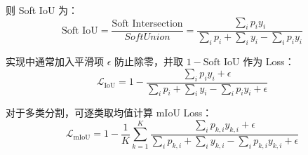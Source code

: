 则 Soft IoU 为： \[
\text{Soft IoU}
= \frac{\text{Soft Intersection}}{Soft Union}
= \frac{\sum_i p_i y_i}{\sum_i p_i + \sum_i y_i - \sum_i p_i y_i}
\]

实现中通常加入平滑项 \(\epsilon\) 防止除零，并取 \(1 - \text{Soft IoU}\)
作为 Loss： \[
\mathcal{L}_{\text{IoU}} = 1 - \frac{\sum_i p_i y_i + \epsilon}{\sum_i p_i + \sum_i y_i - \sum_i p_i y_i + \epsilon}
\]

对于多类分割，可逐类取均值计算 mIoU Loss： \[
\mathcal{L}_{\text{mIoU}}
= 1 - \frac{1}{K} \sum_{k=1}^{K}
\frac{\sum_i p_{k,i} y_{k,i} + \epsilon}{\sum_i p_{k,i} + \sum_i y_{k,i} - \sum_i p_{k,i} y_{k,i} + \epsilon}
\]
